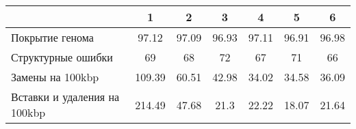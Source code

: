 \begin{adjustbox}{center}
\begin{tabular}{|l||c|c|c|c|c|c|}
\hline
& 1 & 2 & 3 & 4 & 5 & 6 \\
\hline
\hline
Покрытие генома & \cellcolor[RGB]{227, 227, 252} 97.12 & \cellcolor[RGB]{237, 237, 253} 97.09 & \cellcolor[RGB]{252, 227, 227} 96.93 & \cellcolor[RGB]{232, 232, 252} 97.11 & \cellcolor[RGB]{251, 223, 223} 96.91 & \cellcolor[RGB]{253, 241, 241} 96.98 \\
\hline
Структурные ошибки & \cellcolor[RGB]{253, 241, 241} 69 & \cellcolor[RGB]{246, 246, 254} 68 & \cellcolor[RGB]{245, 163, 163} 72 & \cellcolor[RGB]{223, 223, 251} 67 & \cellcolor[RGB]{248, 191, 191} 71 & \cellcolor[RGB]{205, 205, 249} 66 \\
\hline
Замены на 100kbp & \cellcolor[RGB]{235, 71, 71} 109.39 & \cellcolor[RGB]{235, 71, 71} 60.51 & \cellcolor[RGB]{253, 237, 237} 42.98 & \cellcolor[RGB]{227, 227, 252} 34.02 & \cellcolor[RGB]{227, 227, 252} 34.58 & \cellcolor[RGB]{237, 237, 253} 36.09 \\
\hline
Вставки и удаления на 100kbp & \cellcolor[RGB]{235, 71, 71} 214.49 & \cellcolor[RGB]{235, 71, 71} 47.68 & \cellcolor[RGB]{227, 227, 252} 21.3 & \cellcolor[RGB]{253, 241, 241} 22.22 & \cellcolor[RGB]{48, 48, 232} 18.07 & \cellcolor[RGB]{241, 241, 253} 21.64 \\
\hline
\end{tabular}
\end{adjustbox}
